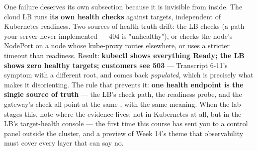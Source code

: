 One failure deserves its own subsection because it is invisible from inside. The cloud LB runs \textbf{its own health checks} against targets, independent of Kubernetes readiness. Two sources of health truth drift: the LB checks  (a path your server never implemented — 404 is "unhealthy"), or checks the node's NodePort on a node whose kube-proxy routes elsewhere, or uses a stricter timeout than readiness. Result: \textbf{kubectl shows everything Ready; the LB shows zero healthy targets; customers see 503} — Transcript 6-11's symptom with a different root, and  comes back \textit{populated}, which is precisely what makes it disorienting. The rule that prevents it: \textbf{one health endpoint is the single source of truth} — the LB's check path, the readiness probe, and the gateway's check all point at the same , with the same meaning. When the lab stages this, note where the evidence lives: not in Kubernetes at all, but in the LB's target-health console — the first time this course has sent you to a control panel outside the cluster, and a preview of Week 14's theme that observability must cover every layer that can say no.

